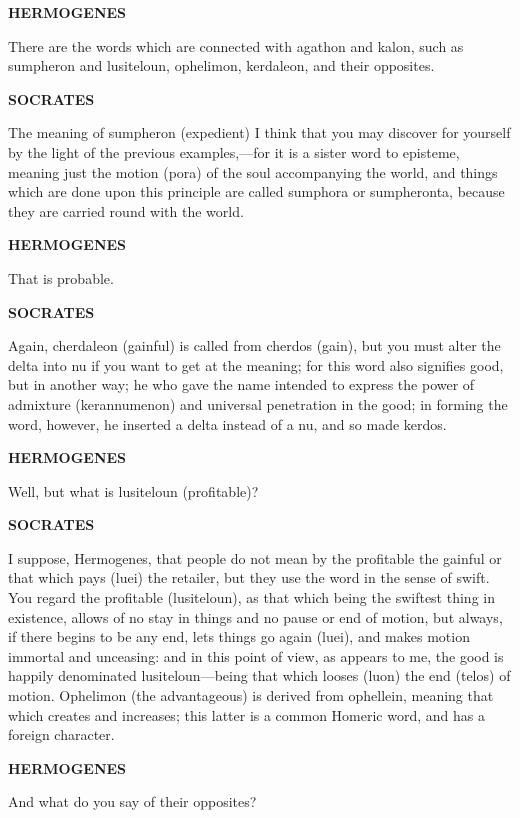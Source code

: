 \documentclass[11pt,letter]{article}
\begin{document}
\par \textbf{HERMOGENES}
\par   There are the words which are connected with agathon and kalon, such as sumpheron and lusiteloun, ophelimon, kerdaleon, and their opposites.

\par \textbf{SOCRATES}
\par   The meaning of sumpheron (expedient) I think that you may discover for yourself by the light of the previous examples,—for it is a sister word to episteme, meaning just the motion (pora) of the soul accompanying the world, and things which are done upon this principle are called sumphora or sumpheronta, because they are carried round with the world.

\par \textbf{HERMOGENES}
\par   That is probable.

\par \textbf{SOCRATES}
\par   Again, cherdaleon (gainful) is called from cherdos (gain), but you must alter the delta into nu if you want to get at the meaning; for this word also signifies good, but in another way; he who gave the name intended to express the power of admixture (kerannumenon) and universal penetration in the good; in forming the word, however, he inserted a delta instead of a nu, and so made kerdos.

\par \textbf{HERMOGENES}
\par   Well, but what is lusiteloun (profitable)?

\par \textbf{SOCRATES}
\par   I suppose, Hermogenes, that people do not mean by the profitable the gainful or that which pays (luei) the retailer, but they use the word in the sense of swift. You regard the profitable (lusiteloun), as that which being the swiftest thing in existence, allows of no stay in things and no pause or end of motion, but always, if there begins to be any end, lets things go again (luei), and makes motion immortal and unceasing:  and in this point of view, as appears to me, the good is happily denominated lusiteloun—being that which looses (luon) the end (telos) of motion. Ophelimon (the advantageous) is derived from ophellein, meaning that which creates and increases; this latter is a common Homeric word, and has a foreign character.

\par \textbf{HERMOGENES}
\par   And what do you say of their opposites?
\end{document}

